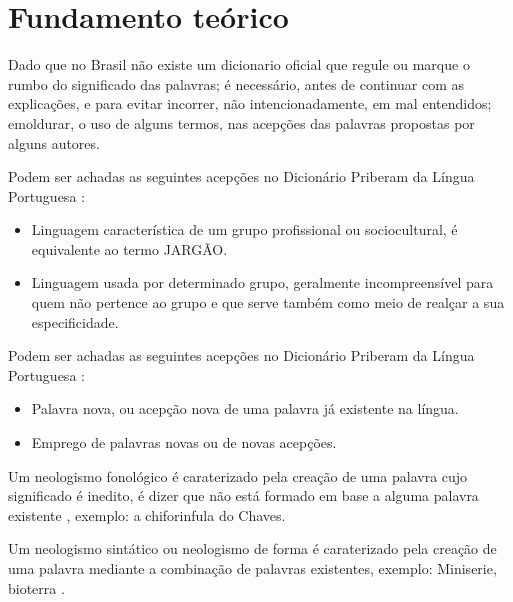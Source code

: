 \section{Fundamento teórico}

Dado que no Brasil não existe um dicionario oficial
que regule ou marque o rumbo do significado das palavras;
é necessário, antes de continuar com as explicações, 
e para evitar incorrer, não intencionadamente, em mal entendidos;
emoldurar, o uso de alguns termos, nas acepções das palavras propostas por alguns autores.
\begin{mydefinition}[Gíria:] 
\label{def:Giria}
Podem ser achadas as seguintes acepções no Dicionário Priberam da Língua Portuguesa \cite{priberamgiria}:
\begin{itemize}
\item Linguagem característica de um grupo profissional ou sociocultural, é equivalente ao termo JARGÃO.
\item Linguagem usada por determinado grupo, 
geralmente incompreensível para quem não pertence ao grupo e que serve também como meio de realçar a sua especificidade.
\end{itemize}
\end{mydefinition}

\begin{mydefinition}[Neologismo:] 
\label{def:Neologismo}
Podem ser achadas as seguintes acepções no Dicionário Priberam da Língua Portuguesa \cite{priberamneologismo}:
\begin{itemize}
\item Palavra nova, ou acepção nova de uma palavra já existente na língua.
\item Emprego de palavras novas ou de novas acepções.
\end{itemize}
\end{mydefinition}

\begin{mydefinition} 
\label{def:NeologismoFonologico}
Um neologismo fonológico é caraterizado pela creação de uma palavra cujo significado é inedito,
é dizer que não está formado em base a alguma palavra existente
\cite[pp. 81-82]{correalingua}, exemplo: a chiforinfula do Chaves.
\end{mydefinition}

\begin{mydefinition} 
\label{def:NeologismoFonologico}
Um neologismo sintático ou neologismo de forma é caraterizado pela creação de uma palavra 
mediante a combinação de palavras existentes, exemplo: Miniserie, bioterra
\cite[pp. 82]{correalingua}.
\end{mydefinition}

